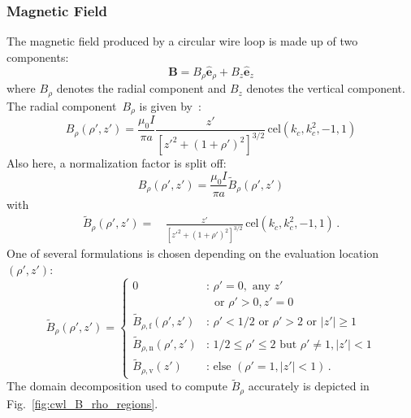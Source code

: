 \subsubsection{Magnetic Field}
The magnetic field produced by a circular wire loop is made up of two components:
\begin{equation}
  \mathbf{B} = B_\rho \hat{\mathbf{e}}_\rho + B_z \hat{\mathbf{e}}_z
\end{equation}
where $B_\rho$ denotes the radial component and $B_z$ denotes the vertical component.
The radial component~$B_\rho$ is given by~\cite{teal}:
\begin{equation}
  B_\rho(\rho', z')
  = \frac{\mu_0 I}{\pi a} \frac{z'}{\left[ z'^2 + (1 + \rho')^2 \right]^{3/2}} \,\mathrm{cel}(k_c, k_c^2, -1, 1)
\end{equation}
Also here, a normalization factor is split off:
\begin{equation}
  B_\rho(\rho', z') = \frac{\mu_0 I}{\pi a} \tilde{B}_\rho(\rho', z')
\end{equation}
with
\begin{align}
  \tilde{B}_\rho(\rho', z')
  =&\, \frac{z'}{\left[ z'^2 + (1 + \rho')^2 \right]^{3/2}} \,\mathrm{cel}(k_c, k_c^2, -1, 1) \, .
\end{align}
One of several formulations is chosen depending on the evaluation location~$(\rho', z')$:
\begin{equation}
  \tilde{B}_\rho(\rho', z')
  = \begin{cases}
      0                                 &:\, \rho' = 0, \textrm{ any } z' \\
                    ~                   &\, ~\textrm{ or } \rho' > 0, z' = 0 \\
      \tilde{B}_{\rho,\mathrm{f}} (\rho', z') &:\, \rho' < 1/2 \textrm{ or } \rho' > 2 \textrm{ or } |z'| \geq 1 \\
      \tilde{B}_{\rho,\mathrm{n}} (\rho', z') &:\, 1/2 \leq \rho' \leq 2 \textrm{ but } \rho' \neq 1, |z'| < 1 \\
      \tilde{B}_{\rho,\mathrm{v}} (z')        &:\, \textrm{else } (\rho' = 1, |z'| < 1) \, .
    \end{cases} \label{eqn:cwl_B_rho_switchover}
\end{equation}
The domain decomposition used to compute $\tilde{B}_\rho$ accurately is depicted in Fig.~\ref{fig:cwl_B_rho_regions}.
